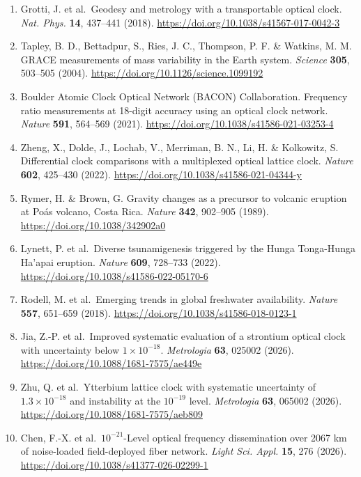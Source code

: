 \documentclass[
  11pt,
  a4paper,
]{article}
\begin{document}
\begin{enumerate}
\item
  Grotti, J. et al.~Geodesy and metrology with a transportable optical
  clock. \emph{Nat. Phys.} \textbf{14}, 437--441 (2018).
  \url{https://doi.org/10.1038/s41567-017-0042-3}
\item
  Tapley, B. D., Bettadpur, S., Ries, J. C., Thompson, P. F. \& Watkins,
  M. M. GRACE measurements of mass variability in the Earth system.
  \emph{Science} \textbf{305}, 503--505 (2004).
  \url{https://doi.org/10.1126/science.1099192}
\item
  Boulder Atomic Clock Optical Network (BACON) Collaboration. Frequency
  ratio measurements at 18-digit accuracy using an optical clock
  network. \emph{Nature} \textbf{591}, 564--569 (2021).
  \url{https://doi.org/10.1038/s41586-021-03253-4}
\item
  Zheng, X., Dolde, J., Lochab, V., Merriman, B. N., Li, H. \&
  Kolkowitz, S. Differential clock comparisons with a multiplexed
  optical lattice clock. \emph{Nature} \textbf{602}, 425--430 (2022).
  \url{https://doi.org/10.1038/s41586-021-04344-y}
\item
  Rymer, H. \& Brown, G. Gravity changes as a precursor to volcanic
  eruption at Poás volcano, Costa Rica. \emph{Nature} \textbf{342},
  902--905 (1989). \url{https://doi.org/10.1038/342902a0}
\item
  Lynett, P. et al.~Diverse tsunamigenesis triggered by the Hunga
  Tonga-Hunga Ha'apai eruption. \emph{Nature} \textbf{609}, 728--733
  (2022). \url{https://doi.org/10.1038/s41586-022-05170-6}
\item
  Rodell, M. et al.~Emerging trends in global freshwater availability.
  \emph{Nature} \textbf{557}, 651--659 (2018).
  \url{https://doi.org/10.1038/s41586-018-0123-1}
\item
  Jia, Z.-P. et al.~Improved systematic evaluation of a strontium
  optical clock with uncertainty below \(1\times10^{-18}\).
  \emph{Metrologia} \textbf{63}, 025002 (2026).
  \url{https://doi.org/10.1088/1681-7575/ae449e}
\item
  Zhu, Q. et al.~Ytterbium lattice clock with systematic uncertainty of
  \(1.3\times10^{-18}\) and instability at the \(10^{-19}\) level.
  \emph{Metrologia} \textbf{63}, 065002 (2026).
  \url{https://doi.org/10.1088/1681-7575/aeb809}
\item
  Chen, F.-X. et al.~\(10^{-21}\)-Level optical frequency dissemination
  over 2067 km of noise-loaded field-deployed fiber network. \emph{Light
  Sci. Appl.} \textbf{15}, 276 (2026).
  \url{https://doi.org/10.1038/s41377-026-02299-1}

\end{enumerate}
\end{document}
